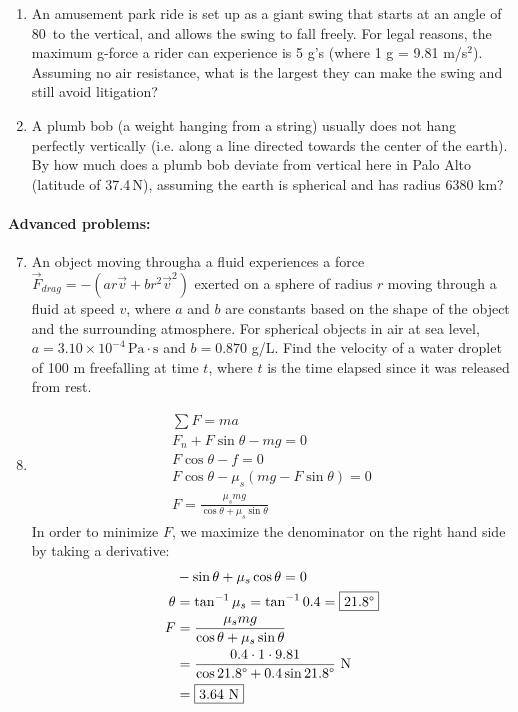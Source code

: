 \documentclass[12pt,letterpaper]{article}
\begin{document}
\begin{multicols}{2}
\begin{enumerate}
\item
An amusement park ride is set up as a giant swing that starts at an angle of 80\degree\ to the vertical, and allows the swing to fall freely. For legal reasons, the maximum g-force a rider can experience is 5 g's (where 1 g = 9.81 m\slash s$^2$). Assuming no air resistance, what is the largest they can make the swing and still avoid litigation?

\item
A plumb bob (a weight hanging from a string) usually does not hang perfectly vertically (i.e. along a line directed towards the center of the earth). By how much does a plumb bob deviate from vertical here in Palo Alto (latitude of 37.4\degree\,N), assuming the earth is spherical and has radius 6380 km?
\end{enumerate}

\paragraph{Advanced problems:}
\begin{enumerate}
\setcounter{enumi}{6}
\item
An object moving througha a fluid experiences a force $\vec{F}_{drag} = -(ar\vec{v} + br^2\vec{v}^2)$ exerted on a sphere of radius $r$ moving through a fluid at speed $v$, where $a$ and $b$ are constants based on the shape of the object and the surrounding atmosphere. For spherical objects in air at sea level, $a = 3.10 \times 10^{-4}\,\text{Pa}\cdot \text{s}$ and $b = 0.870$ g\slash L.
Find the velocity of a water droplet of 100 \textmu m freefalling at time $t$, where $t$ is the time elapsed since it was released from rest.


\item \[
\begin{aligned}
\sum F = ma\\
F_n + F\sin \theta - mg = 0\\
F\cos \theta - f = 0\\
F\cos \theta - \mu_s\left(mg - F\sin \theta\right) = 0\\
F = \frac{\mu_s mg}{\cos \theta + \mu_s \sin \theta}
\end{aligned}
\]
In order to minimize $F$, we maximize the denominator on the right hand side by taking a derivative:
\[
\begin{aligned}
& -\sin \theta + \mu_s \cos \theta = 0\\
\theta &= \tan^{-1} \mu_s = \tan^{-1} 0.4 = \fbox{21.8$\degree$}\\
F &= \frac{\mu_s mg}{\cos \theta + \mu_s \sin \theta}\\
  &= \frac{0.4\cdot 1\cdot 9.81}{\cos 21.8\degree + 0.4 \sin 21.8\degree}\ \text{N}\\
  &= \fbox{3.64 N}
\end{aligned}
\]


\end{enumerate}
\end{multicols}
\end{document}
